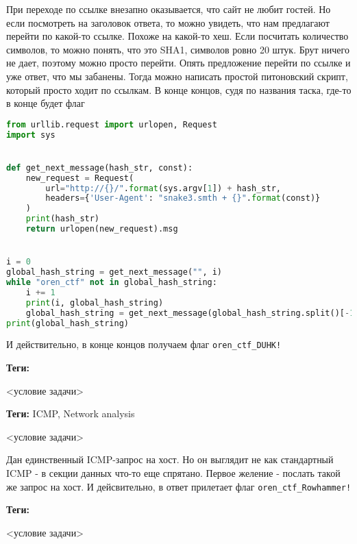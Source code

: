 \documentclass[idxtotoc,hyperref,openany,oneside]{files/admin} %
\begin{document}
При переходе по ссылке внезапно оказывается, что сайт не любит гостей. Но если посмотреть на заголовок ответа, то можно увидеть, что нам предлагают перейти по какой-то ссылке. Похоже на какой-то хеш. Если посчитать количество символов, то можно понять, что это SHA1, символов ровно 20 штук. Брут ничего не дает, поэтому можно просто перейти. Опять предложение перейти по ссылке и уже ответ, что мы забанены. Тогда можно написать простой питоновский скрипт, который просто ходит по ссылкам. В конце концов, судя по названия таска, где-то в конце будет флаг
\begin{lstlisting}[language=Python]
from urllib.request import urlopen, Request
import sys


def get_next_message(hash_str, const):
    new_request = Request(
        url="http://{}/".format(sys.argv[1]) + hash_str,
        headers={'User-Agent': "snake3.smth + {}".format(const)}
    )
    print(hash_str)
    return urlopen(new_request).msg


i = 0
global_hash_string = get_next_message("", i)
while "oren_ctf" not in global_hash_string:
    i += 1
    print(i, global_hash_string)
    global_hash_string = get_next_message(global_hash_string.split()[-1], i)
print(global_hash_string)
\end{lstlisting}

И действительно, в конце концов получаем флаг \verb|oren_ctf_DUHK!|



\textbf{Теги:} \vspace{\baselineskip}

\begin{tcolorbox}
<условие задачи>
\end{tcolorbox}




\textbf{Теги:} ICMP, Network analysis\vspace{\baselineskip}

\begin{tcolorbox}
<условие задачи>
\end{tcolorbox}

Дан единственный ICMP-запрос на хост. Но он выглядит не как стандартный ICMP - в секции данных что-то еще спрятано. Первое желение - послать такой же запрос на хост. И дейсвительно, в ответ прилетает флаг \verb|oren_ctf_Rowhammer!|




\textbf{Теги:} \vspace{\baselineskip}

\begin{tcolorbox}
<условие задачи>
\end{tcolorbox}

\end{document}

